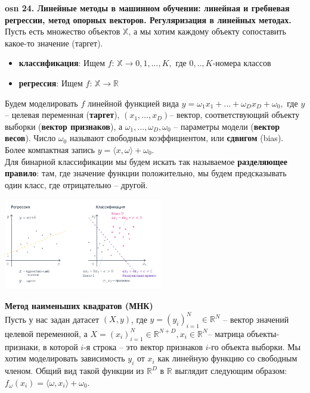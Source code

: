 

\textbf{\LARGE osn 24. Линейные методы в машинном обучении: линейная и гребневая регрессии, метод опорных векторов. Регуляризация в линейных методах. }  \\

Пусть есть множество объектов $\mathbb{X}$, а мы хотим каждому объекту сопоставить какое-то значение (таргет).

\begin{itemize}
    \item \textbf{классификация}: Ищем $f$: $\mathbb{X} \xrightarrow{}0,1,...,K,$ где $0,..,K$-номера классов
    \item \textbf{регрессия}:  Ищем $f$: $\mathbb{X} \xrightarrow{} \mathbb{R}$
\end{itemize}
Будем моделировать $f$ линейной функцией вида $ y = \omega_1x_1+...+\omega_Dx_D+\omega_0,$ где $y$ – целевая переменная (\textbf{таргет}), $(x_1,...,x_D)$– вектор, соответствующий объекту выборки (\textbf{вектор признаков}), а $\omega_1,...,\omega_D,\omega_0$ – параметры модели (\textbf{вектор весов}). Число $\omega_0$ называют свободным коэффициентом, или \textbf{сдвигом} (bias). Более компактная запись $y = \langle{x, \omega}\rangle+\omega_0$. \\
Для бинарной классификации мы будем искать так называемое \textbf{разделяющее правило}: там, где значение функции положительно, мы будем предсказывать один класс, где отрицательно – другой.
\begin{center}
    \includegraphics[height=4cm]{pics/t_osn24_linear_models.png}
\end{center}
\textbf{Метод наименьших квадратов (МНК)} \\
Пусть у нас задан датасет $(X, y)$, где 
$y=(y_i)_{i=1}^N \in \mathbb{R}^{N}$ – вектор значений целевой переменной, а $X=(x_i)_{i=1}^N \in \mathbb{R}^{N+D}, x_i \in \mathbb{R}^{N}$– матрица объекты-признаки, в которой 
$i$-я строка – это вектор признаков 
$i$-го объекта выборки. Мы хотим моделировать зависимость $y_i$ от $x_i$ как линейную функцию со свободным членом. Общий вид такой функции из $\mathbb{R}^D$ в $\mathbb{R}$ выглядит следующим образом: $ f_{\omega}(x_i)=\langle\omega,x_i\rangle+\omega_0$.
